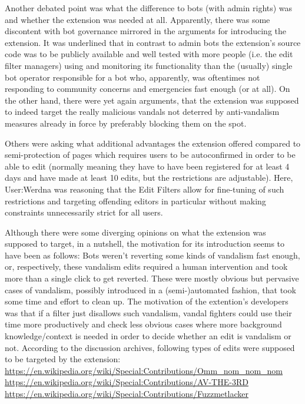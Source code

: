 Another debated point was what the difference to bots (with admin rights) was and whether the extension was needed at all.
Apparently, there was some discontent with bot governance mirrored in the arguments for introducing the extension.
It was underlined that in contrast to admin bots the extension's source code was to be publicly available and well tested with more people (i.e. the edit filter managers) using and monitoring its functionality than the (usually) single bot operator responsible for a bot who, apparently, was oftentimes not responding to community concerns and emergencies fast enough (or at all).
On the other hand, there were yet again arguments, that the extension was supposed to indeed target the really malicious vandals not deterred by anti-vandalism measures already in force by preferably blocking them on the spot.

Others were asking what additional advantages the extension offered compared to semi-protection of pages which requires users to be autoconfirmed in order to be able to edit (normally meaning they have to have been registered for at least 4 days and have made at least 10 edits, but the restrictions are adjustable).
Here, User:Werdna was reasoning that the Edit Filters allow for fine-tuning of such restrictions and targeting offending editors in particular without making constraints unnecessarily strict for all users.

Although there were some diverging opinions on what the extension was supposed to target, in a nutshell, the motivation for its introduction seems to have been as follows:
Bots weren't reverting some kinds of vandalism fast enough, or, respectively, these vandalism edits required a human intervention and took more than a single click to get reverted.
These were mostly obvious but pervasive cases of vandalism, possibly introduced in a (semi-)automated fashion, that took some time and effort to clean up.
The motivation of the extention's developers was that if a filter just disallows such vandalism, vandal fighters could use their time more productively and check less obvious cases where more background knowledge/context is needed in order to decide whether an edit is vandalism or not.
According to the discussion archives, following types of edits were supposed to be targeted by the extension:\\
\url{https://en.wikipedia.org/wiki/Special:Contributions/Omm_nom_nom_nom}\\
\url{https://en.wikipedia.org/wiki/Special:Contributions/AV-THE-3RD}\\
\url{https://en.wikipedia.org/wiki/Special:Contributions/Fuzzmetlacker}\\


